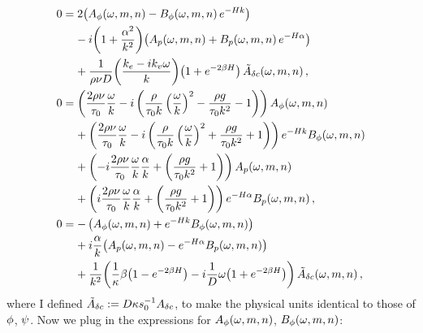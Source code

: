 \documentclass[reqno]{amsart}
\numberwithin{equation}{section}
\numberwithin{figure}{section}
\begin{document}
\begin{align*}
0
  &= 2\!\left(A_{\vPotential}\!\left(\omega,m,n\right)-B_{\vPotential}\!\left(\omega,m,n\right)e^{-\aHeight k}\right) \\
  &\phantom{=}\,\,-i\!\left(1+\frac{\alpha^{2}}{k^{2}}\right)\!\left(A_{p}\!\left(\omega,m,n\right)+B_{p}\!\left(\omega,m,n\right)e^{-\aHeight\alpha}\right) \\
  &\phantom{=}\,\,+\frac{1}{\sDensity\kinematicViscousity D}\!\left(\frac{k_{e}-ik_{v}\omega}{k}\right)\!\left(1+e^{-2\beta \aHeight}\right)\tilde{A}_{\delta\sBulkCo}\!\left(\omega,m,n\right), \\
0
  &= \left(\frac{2\sDensity\kinematicViscousity}{\sTension_{0}}\frac{\omega}{k}-i\left(\frac{\sDensity}{\sTension_{0}k}\left(\frac{\omega}{k}\right)^{2}-\frac{\sDensity g}{\sTension_{0}k^{2}}-1\right)\right)A_{\vPotential}\!\left(\omega,m,n\right) \\
  &\phantom{=}\,\,+\left(\frac{2\sDensity\kinematicViscousity}{\sTension_{0}}\frac{\omega}{k}-i\left(\frac{\sDensity}{\sTension_{0}k}\left(\frac{\omega}{k}\right)^{2}+\frac{\sDensity g}{\sTension_{0}k^{2}}+1\right)\right)e^{-\aHeight k}B_{\vPotential}\!\left(\omega,m,n\right) \\
  &\phantom{=}\,\,+\left(-i\frac{2\sDensity\kinematicViscousity}{\sTension_{0}}\frac{\omega}{k}\frac{\alpha}{k}+\left(\frac{\sDensity g}{\sTension_{0}k^{2}}+1\right)\right)A_{p}\!\left(\omega,m,n\right) \\
  &\phantom{=}\,\,+\left(i\frac{2\sDensity\kinematicViscousity}{\sTension_{0}}\frac{\omega}{k}\frac{\alpha}{k}+\left(\frac{\sDensity g}{\sTension_{0}k^{2}}+1\right)\right)e^{-\aHeight\alpha}B_{p}\!\left(\omega,m,n\right), \\
0
  &= -\left(A_{\vPotential}\!\left(\omega,m,n\right)+e^{-\aHeight k}B_{\vPotential}\!\left(\omega,m,n\right)\right) \\
  &\phantom{=}\,\,+i\frac{\alpha}{k}\!\left(A_{p}\!\left(\omega,m,n\right)-e^{-\aHeight\alpha}B_{p}\!\left(\omega,m,n\right)\right) \\
  &\phantom{=}\,\,+\frac{1}{k^{2}}\!\left(\frac{1}{\kappa}\beta\!\left(1-e^{-2\beta \aHeight}\right)-i\frac{1}{D}\omega\!\left(1+e^{-2\beta \aHeight}\right)\right)\tilde{A}_{\delta\sBulkCo}\!\left(\omega,m,n\right),
\end{align*}
where I defined $\tilde{A}_{\delta c}:=D\kappa s_{0}^{-1}A_{\delta c}$, to make the physical units identical to those of $\phi$, $\psi$. Now we plug in the expressions for $A_{\phi}\!\left(\omega,m,n\right)$, $B_{\phi}\!\left(\omega,m,n\right)$:
\end{document}
